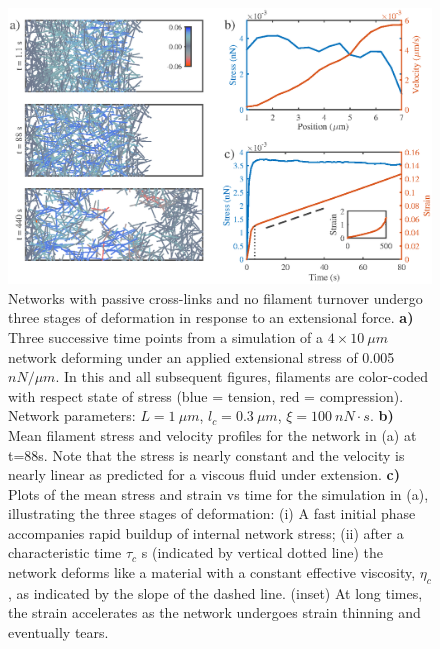 \documentclass[10pt,letterpaper]{article}
\begin{document}
\begin{figure}[h!]
\centering
\includegraphics[width=\hsize]{figures/figure3a}
\caption{\label{fig:passive_ex}  Networks with passive cross-links and no filament turnover undergo three stages of deformation in response to an extensional force.   \textbf{a)} Three successive time points from a simulation of a $4\times10\: \mu m$ network deforming under an applied extensional stress of 0.005 $nN/\mu m$. In this and all subsequent figures, filaments are color-coded with respect state of stress (blue = tension, red = compression).  Network parameters: $L=1\: \mu m$, $l_c=0.3\: \mu m$, $\xi=100\: nN\cdot s$. \textbf{b)} Mean filament stress and velocity profiles for the  network in (a) at t=88s. Note that the stress is nearly constant and the velocity is nearly linear as predicted for a viscous fluid under extension.  \textbf{c)} Plots of the mean stress and strain
vs time for the simulation in (a), illustrating the three stages of deformation: (i) A fast initial phase accompanies rapid buildup of internal network stress; (ii) after a characteristic time $\tau_c$ s (indicated by vertical dotted line) the network deforms like a material with a constant effective viscosity, $\eta_c$, as indicated by the slope of the dashed line.  (inset) At long times, the strain accelerates as the network undergoes strain thinning and eventually tears. }
\end{figure}
\end{document}
